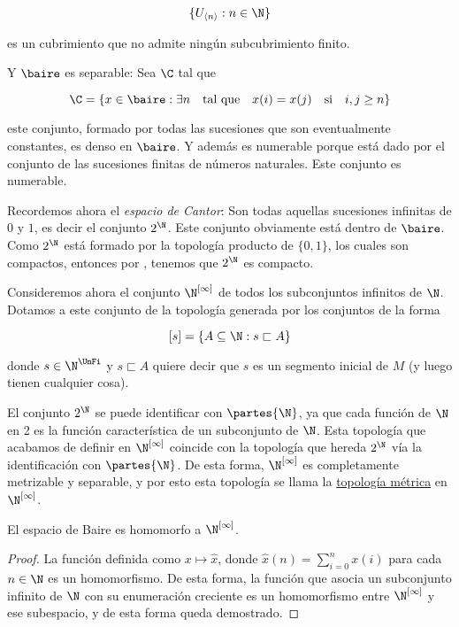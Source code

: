 \[
\{ U_{\langle n \rangle} : n \in \N \}
\]

\noindent es un cubrimiento que no admite ningún subcubrimiento finito.

Y $\baire$ es separable: Sea $\C$ tal que

\[
\C = \{ x \in \baire : \exists n \quad \text{tal que} \quad x(i) = x(j) \quad \text{si} \quad i,j \geq n \}
\]

\noindent este conjunto, formado por todas las sucesiones que son eventualmente constantes, es denso en $\baire$. Y además es numerable porque está dado por el conjunto de las sucesiones finitas de números naturales. Este conjunto es numerable.

Recordemos ahora el \textit{espacio de Cantor}: Son todas aquellas sucesiones infinitas de $0$ y $1$, es decir el conjunto $2^{\N}$. Este conjunto obviamente está dentro de $\baire$. Como $2^{\N}$ está formado por la topología producto de $\{0,1\}$, los cuales son compactos, entonces
por \TT, tenemos que $2^{\N}$ es compacto.

Consideremos ahora el conjunto $\N^{[\infty]}$ de todos los subconjuntos infinitos de $\N$. Dotamos a este conjunto de la topología generada por los conjuntos de la forma

\[
[s] = \{ A \subseteq \N : s \sqsubset A \}
\]

\noindent donde $s \in \N^{\UnFi}$ y $s \sqsubset A$ quiere decir que $s$ es un segmento inicial de $M$ (y luego tienen cualquier cosa).

El conjunto $2^{\N}$ se puede identificar con $\partes{\N}$, ya que cada función de $\N$ en 2 es la función característica de un subconjunto de $\N$. Esta topología que acabamos de definir en $\N^{[\infty]}$ coincide con la topología que hereda $2^{\N}$ vía la identificación con $\partes{\N}$. De esta forma, $\N^{[\infty]}$ es completamente metrizable y separable, y por esto esta topología se llama la \ul{topología métrica} en $\N^{[\infty]}$.

\begin{pro}
    El espacio de Baire es homomorfo a $\N^{[\infty]}$.
\end{pro}

\begin{proof}
    La función definida como $x \mapsto \hat{x}$, donde $\hat{x}(n) = \sum_{i=0}^n x(i)$ para cada $n \in \N$ es un homomorfismo. De esta forma, la función que asocia un subconjunto infinito de $\N$ con su enumeración creciente es un homomorfismo entre $\N^{[\infty]}$ y ese subespacio, y de esta forma queda demostrado.
\end{proof}

